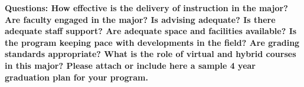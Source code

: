 \documentclass[12pt]{article}
\begin{document}
{\bf Questions: How effective is the delivery of instruction in the major? Are faculty engaged in the major? Is advising adequate? Is there adequate staff support? Are adequate space and facilities available? Is the program keeping pace with developments in the field? Are grading standards appropriate? What is the role of virtual and hybrid courses in this major? Please attach or include here a sample 4 year graduation plan for your program.}\\[3pt]

\end{document}
